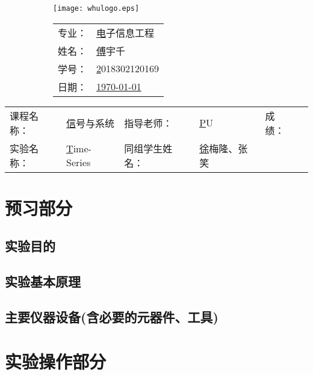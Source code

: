 \documentclass{whureport}
\newcommand{\major}{电子信息工程}
\newcommand{\name}{傅宇千}
\newcommand{\stuid}{2018302120169}
\newcommand{\newdate}{\today}
\newcommand{\loc}{None}
\newcommand{\course}{信号与系统}
\newcommand{\tutor}{PU}
\newcommand{\grades}{~~~~~~~}
\newcommand{\newtitle}{Time-Series}
\newcommand{\group}{徐梅隆、张笑}
\begin{document}
\thispagestyle{empty}
\begin{figure}[h]
  \begin{subfigure}{0.4\linewidth}
    \centerline{\texttt{[image: whulogo.eps]}}
  \end{subfigure}
  \hfill
  \begin{subfigure}{.5\linewidth}
    \raggedleft
    \begin{tabular*}{.8\linewidth}{ll}
      专业： & \underline\major   \\
      姓名： & \underline\name    \\
      学号： & \underline\stuid   \\
      日期： & \underline\newdate \\
    \end{tabular*}
  \end{subfigure}
\end{figure}

\begin{table}[!htbp]
  \centering
  \begin{tabular*}{0.7\linewidth}{llllll}
    课程名称： & \underline\course   & 指导老师： & \underline\tutor   & 成绩：       &  \underline\grades \\
    实验名称： & \underline\newtitle & 同组学生姓名：& \underline\group
  \end{tabular*}
\end{table}


\section{预习部分}
\subsection{实验目的}

\subsection{实验基本原理}

\subsection{主要仪器设备(含必要的元器件、工具)}

\section{实验操作部分}
\end{document}
